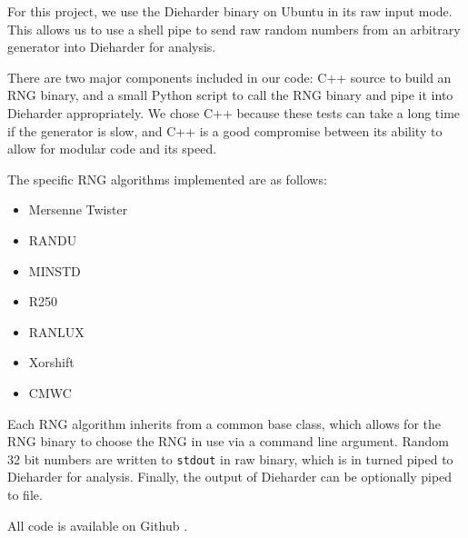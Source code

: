For this project, we use the Dieharder binary on Ubuntu in its raw input mode. This allows us to use a shell pipe to send raw random numbers from an arbitrary generator into Dieharder for analysis.

There are two major components included in our code: C++ source to build an RNG binary, and a small Python script to call the RNG binary and pipe it into Dieharder appropriately. We chose C++ because these tests can take a long time if the generator is slow, and C++ is a good compromise between its ability to allow for modular code and its speed.

The specific RNG algorithms implemented are as follows:
\begin{itemize}
    \item Mersenne Twister
    \item RANDU
    \item MINSTD
    \item R250
    \item RANLUX
    \item Xorshift
    \item CMWC
\end{itemize}
Each RNG algorithm inherits from a common base class, which allows for the RNG binary to choose the RNG in use via a command line argument. Random 32 bit numbers are written to \texttt{stdout} in raw binary, which is in turned piped to Dieharder for analysis. Finally, the output of Dieharder can be optionally piped to file.

All code is available on Github \cite{github_repo}.
